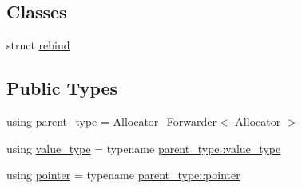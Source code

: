 \subsection*{Classes}
\begin{DoxyCompactItemize}
\item 
struct \hyperlink{structbc_1_1allocators_1_1Logging__Allocator_1_1rebind}{rebind}
\end{DoxyCompactItemize}
\subsection*{Public Types}
\begin{DoxyCompactItemize}
\item 
using \hyperlink{structbc_1_1allocators_1_1Logging__Allocator_a0ba4413e3f0e6957cd5806ae59511d38}{parent\+\_\+type} = \hyperlink{structbc_1_1allocators_1_1Allocator__Forwarder}{Allocator\+\_\+\+Forwarder}$<$ \hyperlink{classbc_1_1allocators_1_1Allocator}{Allocator} $>$
\item 
using \hyperlink{structbc_1_1allocators_1_1Logging__Allocator_af0f639779c1d0d646bca2c077c34d7d3}{value\+\_\+type} = typename \hyperlink{structbc_1_1allocators_1_1Allocator__Forwarder_a3ac0b07579279c948a24ee6562510dc5}{parent\+\_\+type\+::value\+\_\+type}
\item 
using \hyperlink{structbc_1_1allocators_1_1Logging__Allocator_abde1034a802fbcbac68098d8406b490f}{pointer} = typename \hyperlink{structbc_1_1allocators_1_1Allocator__Forwarder_ae9d48fbeb22a6686ad59128cf309d8bd}{parent\+\_\+type\+::pointer}
\end{DoxyCompactItemize}
